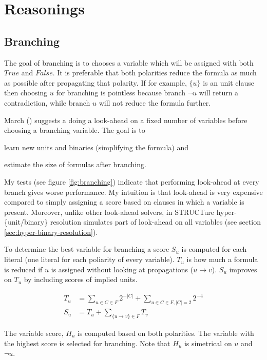 \chapter{Reasonings}

\section {Branching}

The goal of branching is to chooses a variable which will be
assigned with both $True$ and $False$. It is preferable that both
polarities reduce the formula as much as possible after propagating
that polarity. If for example, $\{ u \}$ is an unit clause then
choosing $u$ for branching is pointless because branch $\neg u$
will return a contradiction, while branch $u$ will not reduce the
formula further.

March (\cite{mine:march}) suggests a doing a look-ahead  on a fixed number of variables before choosing a
branching variable.  The goal is to
\begin{inparaenum}
\item learn new units and binaries (simplifying the formula) and
\item estimate the size of formulas after branching.
\end{inparaenum}

My tests (see figure \ref{fig:branching}) indicate that performing
look-ahead at every branch gives worse performance. My intuition
is that look-ahead is very expensive compared to simply assigning
a score based on clauses in which a variable is present. Moreover,
unlike other look-ahead solvers, in STRUCTure hyper-\{unit/binary\}
resolution simulates part of look-ahead on all variables (see
section \ref{sec:hyper-binary-resolution}).

To determine the best variable for branching a score $S_u$ is
computed for each literal (one literal for each poliarity of
every variable). $T_u$ is how much a formula is reduced if $u$
is assigned without looking at propagations ($u \rightarrow v$).
$S_u$ improves on $T_u$ by including scores of implied units.

\begin{align}
  T_u &= \sum_{u \in C \in F}{2^{-|C|}} + \sum_{u \in C \in F, |C| = 2}{2^{-4}} \\
  S_u &= T_u + \sum_{\{ u \rightarrow v \} \in F}{T_v}
\end{align}

The variable score, $H_u$ is computed based on both polarities.
The variable with the highest score is selected for branching. Note that
$H_u$ is simetrical on $u$ and $\neg u$.

